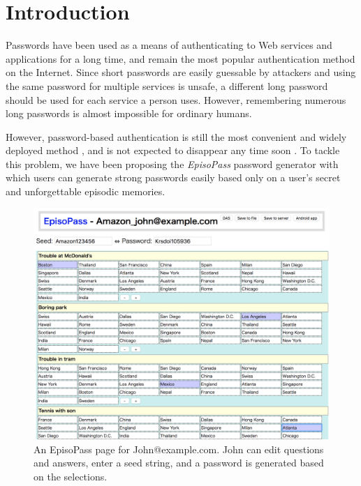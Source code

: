 \documentclass[sigconf]{acmart}
\begin{document}
\section{Introduction}

Passwords have been used as a means of authenticating to Web services
and applications for a long time, and remain the most popular
authentication method on the Internet.
Since short passwords are easily guessable by attackers and using the
same password for multiple services is unsafe, a different long
password should be used for each service a person uses.
However, remembering numerous long passwords is almost impossible for
ordinary humans.

However, password-based authentication is still the most convenient
and widely deployed method \cite{Bonneau:ReplacePasswords}, and is not
expected to disappear any time soon \cite{Herley:2009:PSS:1601990.1602010}.
%
To tackle this problem,
we have been proposing the \textit{EpisoPass} password generator \cite{Masui:EpisoPass}
with which users can generate strong passwords easily
based only on a user's secret and unforgettable episodic memories.


\begin{figure}[t]
  \centerline{\includegraphics[width=13cm,bb=-250 -100 1524 1286]{figures/EpisoPass1.png}}
  \caption{An EpisoPass page for \textsf{John@example.com}. John can edit questions and answers, enter a seed string,
  and a password is generated based on the selections.}
  \label{EpisoPass}
\end{figure}
\end{document}

